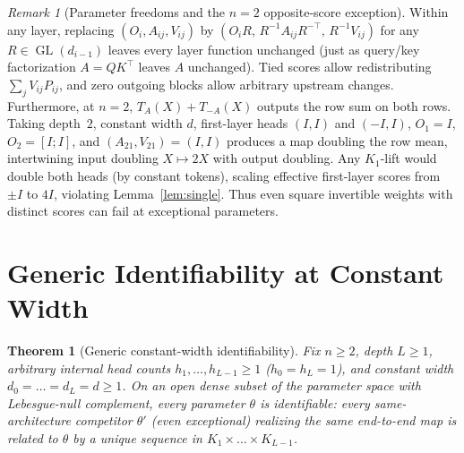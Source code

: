 \documentclass[11pt]{article}
\theoremstyle{plain}
\newtheorem{theorem}{Theorem}
\theoremstyle{definition}
\theoremstyle{remark}
\newtheorem{remark}{Remark}
\DeclareMathOperator{\GL}{GL}
\begin{document}
\begin{remark}[Parameter freedoms and the $n = 2$ opposite-score exception]
Within any layer, replacing $(O_i, A_{ij}, V_{ij})$ by $(O_i R,\, R^{-1} A_{ij} R^{-\top},\, R^{-1} V_{ij})$ for any $R \in \GL(d_{i-1})$ leaves every layer function unchanged (just as query/key factorization $A = QK^\top$ leaves $A$ unchanged). Tied scores allow redistributing $\sum_j V_{ij} P_{ij}$, and zero outgoing blocks allow arbitrary upstream changes. Furthermore, at $n = 2$, $T_A(X) + T_{-A}(X)$ outputs the row sum on both rows. Taking depth~$2$, constant width $d$, first-layer heads $(I, I)$ and $(-I, I)$, $O_1 = I$, $O_2 = [I; I]$, and $(A_{21}, V_{21}) = (I, I)$ produces a map doubling the row mean, intertwining input doubling $X \mapsto 2X$ with output doubling. Any $K_1$-lift would double both heads (by constant tokens), scaling effective first-layer scores from $\pm I$ to $4I$, violating Lemma~\ref{lem:single}. Thus even square invertible weights with distinct scores can fail at exceptional parameters.
\end{remark}

\section{Generic Identifiability at Constant Width}

\begin{theorem}[Generic constant-width identifiability]\label{thm:constwidth}
Fix $n \ge 2$, depth $L \ge 1$, arbitrary internal head counts $h_1, \dots, h_{L-1} \ge 1$ ($h_0 = h_L = 1$), and constant width $d_0 = \dots = d_L = d \ge 1$. On an open dense subset of the parameter space with Lebesgue-null complement, every parameter $\theta$ is identifiable: every same-architecture competitor $\theta'$ (even exceptional) realizing the same end-to-end map is related to $\theta$ by a unique sequence in $K_1 \times \dots \times K_{L-1}$.
\end{theorem}
\end{document}
